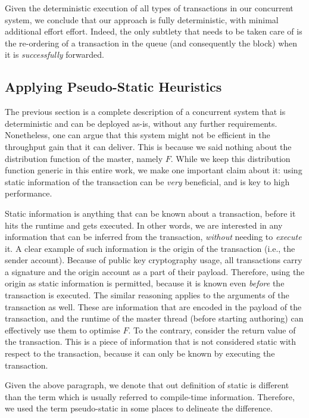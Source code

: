 Given the deterministic execution of all types of transactions in our concurrent system, we conclude that our approach is fully deterministic, with minimal additional effort
effort. Indeed, the only subtlety that needs to be taken care of is the re-ordering of a transaction in
the queue (and consequently the block) when it is \textit{successfully} forwarded.


\subsection{Applying Pseudo-Static Heuristics} \label{subsec:applying_static_hints}

The previous section is a complete description of a concurrent system that is deterministic and can be deployed
as-is, without any further requirements. Nonetheless, one can argue that this system might not be
efficient in the throughput gain that it can deliver. This is because we said nothing about the
distribution function of the master, namely $F$. While we keep this distribution function generic in
this entire work, we make one important claim about it: using static information of
the transaction can be \textit{very} beneficial, and is key to high performance.

Static information is anything that can be known about a transaction, before it hits the runtime
and gets executed. In other words, we are interested in any information that can be inferred from
the transaction, \textit{without} needing to \textit{execute} it. A clear example of such information is the
origin of the transaction (i.e., the sender account). Because of public key cryptography usage, all
transactions carry a signature and the origin account as a part of their payload. Therefore, using
the origin as static information is permitted, because it is known even \textit{before} the
transaction is executed. The similar reasoning applies to the arguments of the transaction as well.
These are information that are encoded in the payload of the transaction, and the runtime of the
master thread (before starting authoring) can effectively use them to optimise $F$. To the contrary,
consider the return value of the transaction. This is a piece of information that is not considered
static with respect to the transaction, because it can only be known by executing the transaction.

\begin{remark}
	Given the above paragraph, we denote that out definition of static is different than the term
	which is usually referred to compile-time information. Therefore, we used the term pseudo-static
	in some places to delineate the difference.
\end{remark}

